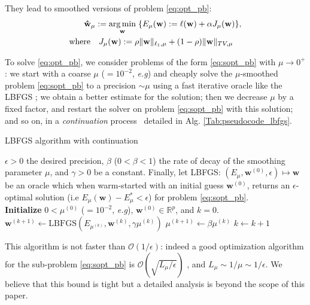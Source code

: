 They lead to smoothed versions of problem \eqref{eq:opt_pb}:
\begin{align}
  \mathbf{\hat{w}}_{\mu} := \operatorname*{arg\,min}_{\mathbf{w}}\;
  \{E_{\mu}(\mathbf{w}) := \ell(\mathbf{w}) + \alpha
    J_{\mu}(\mathbf{w})\},
  \label{eq:sopt_pb}
\\
    \text{where} \quad
    J_{\mu}(\mathbf{w}) :=\rho \|\mathbf{w}\|_{\ell_{1},\mu} +
    (1 - \rho)\|\mathbf{w}\|_{TV, \mu} \quad
\end{align}

To solve \eqref{eq:opt_pb}, we consider problems of the form
\eqref{eq:sopt_pb} with $\mu \rightarrow 0^+$: we start with a coarse
$\mu$ ($= 10^{-2}$, \emph{e.g}) and cheaply solve the $\mu$-smoothed problem
\eqref{eq:sopt_pb} to a precision $\sim \mu$ using a fast
iterative oracle like the LBFGS \citep{ciyou1994}; we
obtain a better estimate for the solution; then we decrease $\mu$ by a fixed factor,
and restart the solver on problem \eqref{eq:sopt_pb} with this solution; and so on, in a 
\emph{continuation} process~\citep{NESTA} detailed in Alg.
\ref{Tab:pseudocode_lbfgs}.

\begin{algorithm}
  \caption{LBFGS algorithm with continuation}
  \label{Tab:pseudocode_lbfgs}  
  \begin{algorithmic}[1]  
    \Require $\epsilon > 0$ the desired precision, $\beta$ ($0 < \beta <
    1$) the rate of decay of the smoothing parameter $\mu$, and $\gamma > 0$ be a constant.
    Finally,
    let LBFGS: $(E_\mu, \mathbf{w}^{(0)}, \epsilon) \mapsto \mathbf{w}$ be
    an oracle which when warm-started with an initial guess
    $\mathbf{w}^{(0)}$, returns an $\epsilon$-optimal
    solution (i.e $E_\mu(\mathbf{w}) - E_\mu^{*} < \epsilon$) for problem \eqref{eq:sopt_pb}.\\
    \textbf{Initialize} $ 0 < \mu^{(0)}$ ($= 10^{-2}$, \emph{e.g}),
    $\mathbf{w}^{(0)}\in \mathbb{R}^p$, and $k = 0$.
    \State $\mathbf{w}^{(k + 1)} \leftarrow \mbox{LBFGS}(E_{\mu^{(k)}}, \mathbf{w}^{(k)}, \gamma\mu^{(k)})$
    \State $\mu^{(k + 1)} \leftarrow \beta \mu^{(k)}$
    \State $k \leftarrow k + 1$
    \EndWhile
  \end{algorithmic}
\end{algorithm}

This algorithm is not faster than
$\mathcal{O}(1/\epsilon)$: indeed a good optimization algorithm
for the sub-problem \eqref{eq:sopt_pb} is $\mathcal{O}(\sqrt{L_{\mu}/\epsilon})$
\citep{nesterov1983}, and $L_{\mu} \sim 1 / \mu \sim 1 / \epsilon$. We
believe that this bound is tight but a detailed analysis is
beyond the scope of this paper.

